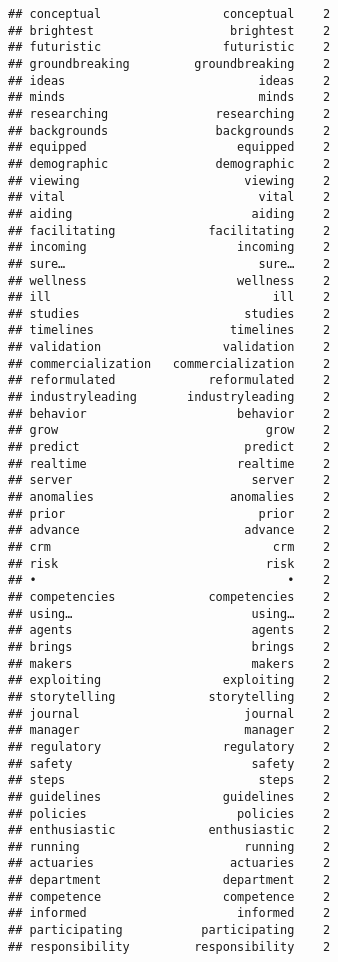 \documentclass[]{article}
\begin{document}
\begin{verbatim}
## conceptual                 conceptual    2
## brightest                   brightest    2
## futuristic                 futuristic    2
## groundbreaking         groundbreaking    2
## ideas                           ideas    2
## minds                           minds    2
## researching               researching    2
## backgrounds               backgrounds    2
## equipped                     equipped    2
## demographic               demographic    2
## viewing                       viewing    2
## vital                           vital    2
## aiding                         aiding    2
## facilitating             facilitating    2
## incoming                     incoming    2
## sure…                           sure…    2
## wellness                     wellness    2
## ill                               ill    2
## studies                       studies    2
## timelines                   timelines    2
## validation                 validation    2
## commercialization   commercialization    2
## reformulated             reformulated    2
## industryleading       industryleading    2
## behavior                     behavior    2
## grow                             grow    2
## predict                       predict    2
## realtime                     realtime    2
## server                         server    2
## anomalies                   anomalies    2
## prior                           prior    2
## advance                       advance    2
## crm                               crm    2
## risk                             risk    2
## •                                   •    2
## competencies             competencies    2
## using…                         using…    2
## agents                         agents    2
## brings                         brings    2
## makers                         makers    2
## exploiting                 exploiting    2
## storytelling             storytelling    2
## journal                       journal    2
## manager                       manager    2
## regulatory                 regulatory    2
## safety                         safety    2
## steps                           steps    2
## guidelines                 guidelines    2
## policies                     policies    2
## enthusiastic             enthusiastic    2
## running                       running    2
## actuaries                   actuaries    2
## department                 department    2
## competence                 competence    2
## informed                     informed    2
## participating           participating    2
## responsibility         responsibility    2

\end{verbatim}
\end{document}
